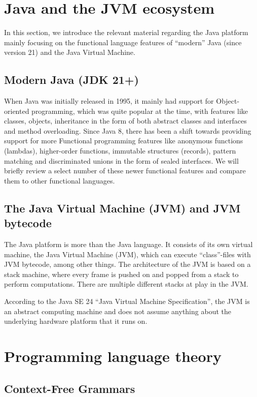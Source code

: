 \section{Java and the JVM ecosystem}

In this section, we introduce the relevant material regarding the Java platform mainly focusing
on the functional language features of ``modern'' Java (since version 21) and the Java Virtual
Machine.

\subsection{Modern Java (JDK 21+)}

When Java was initially released in 1995, it mainly had support for Object-oriented 
programming, which was quite popular at the time, with features like classes, objects, 
inheritance in the form of both abstract classes and interfaces and method overloading.
Since Java 8, there has been a shift towards providing support for more Functional 
programming features like anonymous functions (lambdas), higher-order functions, immutable
structures (records), pattern matching and discriminated unions in the form of sealed 
interfaces. We will briefly review a select number of these newer functional features
and compare them to other functional languages.

\subsection{The Java Virtual Machine (JVM) and JVM bytecode}

The Java platform is more than the Java language. It consists of its own virtual machine,
the Java Virtual Machine (JVM), which can execute ``class''-files with JVM bytecode, among other things.
The architecture of the JVM is based on a stack machine, where every frame is pushed on and popped from
a stack to perform computations. There are multiple different stacks at play in the JVM.

According to the Java SE 24 ``Java Virtual Machine Specification'', the JVM is an abstract computing machine
and does not assume anything about the underlying hardware platform that it runs on.

\section{Programming language theory}

\subsection{Context-Free Grammars}

